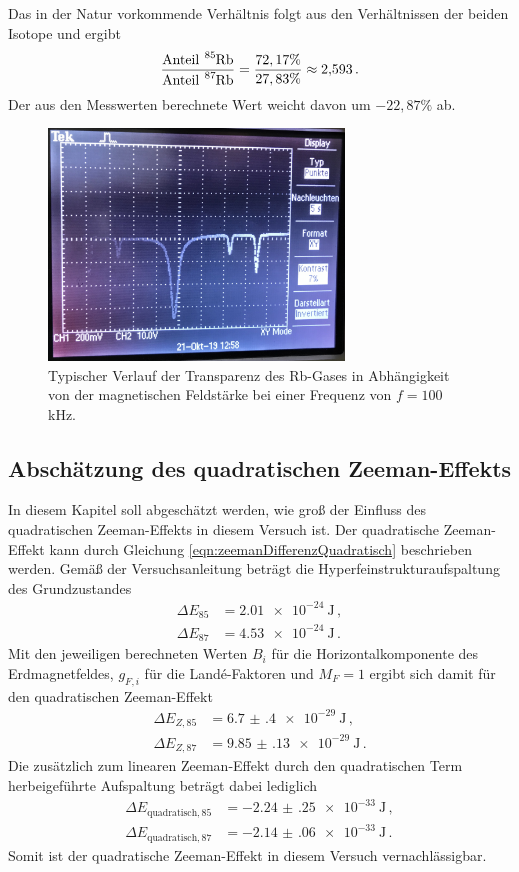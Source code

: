 Das in der Natur vorkommende Verhältnis folgt aus den Verhältnissen der beiden Isotope \cite{verhältnis}
und ergibt
\begin{equation}
  \frac{\text{Anteil}~ \ce{^{85}Rb}}{\text{Anteil}~ \ce{^{87}Rb}}=\frac{72,17\%}{27,83\%} \approx 2{,}593 \,.
\end{equation}
Der aus den Messwerten berechnete Wert weicht davon um $-22{,}87\%$ ab.

\begin{figure}
  \centering
  \includegraphics[width=0.7\textwidth]{data/foto.jpg}
  \caption{Typischer Verlauf der Transparenz des Rb-Gases in Abhängigkeit von der magnetischen Feldstärke bei einer Frequenz von $f=100\,$kHz.}
  \label{fig:foto}
\end{figure}


\subsection{Abschätzung des quadratischen Zeeman-Effekts}
\label{subsec:zeeman}
In diesem Kapitel soll abgeschätzt werden, wie groß der Einfluss des quadratischen Zeeman-Effekts
in diesem Versuch ist. Der quadratische Zeeman-Effekt kann durch Gleichung
\eqref{eqn:zeemanDifferenzQuadratisch} beschrieben werden. Gemäß der Versuchsanleitung \cite{Versuchsanleitung} beträgt die
Hyperfeinstrukturaufspaltung des Grundzustandes
\begin{align*}
  \Delta E_{85}&= \SI{2.01e-24}{\joule}\,,\\
  \Delta E_{87}&= \SI{4.53e-24}{\joule}\,.
\end{align*}
Mit den jeweiligen berechneten Werten $B_i$ für die Horizontalkomponente des Erdmagnetfeldes,
$g_{F,i}$ für die Landé-Faktoren und $M_F=1$ ergibt sich damit für den quadratischen Zeeman-Effekt
\begin{align*}
  \Delta E_{Z,85}&=\SI{6.7(4)e-29}{\joule}\,,\\
  \Delta E_{Z,87}&=\SI{9.85(13)e-29}{\joule}\,.
\end{align*}
Die zusätzlich zum linearen Zeeman-Effekt durch den quadratischen Term herbeigeführte Aufspaltung beträgt dabei lediglich
\begin{align*}
  \Delta E_{\text{quadratisch},85}&=\SI{-2.24(25)e-33}{\joule}\,,\\
  \Delta E_{\text{quadratisch},87}&=\SI{-2.14(06)e-33}{\joule}\,.
\end{align*}
Somit ist der quadratische Zeeman-Effekt in diesem Versuch vernachlässigbar.

